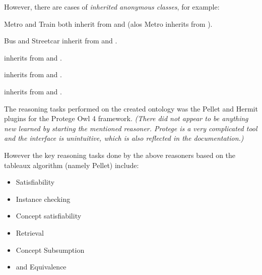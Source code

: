 \documentclass[letterpaper,10pt,english]{sphinxmanual}
\begin{document}
However, there are cases of \emph{inherited anonymous classes}, for example:

Metro and Train both inherit from  and
 (alos Metro inherits from
).

Bus and Streetcar inherit from  and
.

 inherits from  and .

 inherits from  and .

 inherits from  and
.

The reasoning tasks performed on the created ontology was the Pellet and Hermit
plugins for the Protege Owl 4 framework.  \emph{(There did not appear to be anything
new learned by starting the mentioned reasoner.  Protege is a very complicated
tool and the interface is unintuitive, which is also reflected in the
documentation.)}

However the key reasoning tasks done by the above reasoners based on the
tableaux algorithm (namely Pellet) include:
\begin{itemize}
\item {} 
Satisfiability

\item {} 
Instance checking

\item {} 
Concept satisfiability

\item {} 
Retrieval

\item {} 
Concept Subsumption

\item {} 
and Equivalence

\end{itemize}
\end{document}
